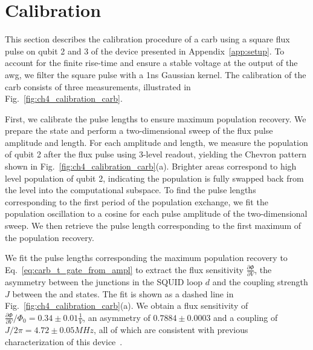 \section{Calibration} \label{sec:carb_calibration}
This section describes the calibration procedure of a \gls{carb} using a square flux pulse on qubit 2 and 3 of the device presented in Appendix~\ref{app:setup}. To account for the finite rise-time and ensure a stable voltage at the output of the \gls{awg}, we filter the square pulse with a 1\unit{ns} Gaussian kernel. The calibration of the \gls{carb} consists of three measurements, illustrated in Fig.~\ref{fig:ch4_calibration_carb}.

First, we calibrate the pulse lengths to ensure maximum population recovery. We prepare the \oo{} state and perform a two-dimensional sweep of the flux pulse amplitude and length. For each amplitude and length, we measure the \1{} population of qubit 2 after the flux pulse using 3-level readout, yielding the Chevron pattern shown in Fig.~\ref{fig:ch4_calibration_carb}(a). Brighter areas correspond to high
level population of qubit 2, indicating the population is fully swapped back from the \2{} level into the computational subspace. To find the pulse lengths corresponding to the first period of the population exchange, we fit the \1{} population oscillation to a cosine for each pulse amplitude of the two-dimensional sweep. We then retrieve the pulse length corresponding to the first maximum of the population recovery.

We fit the pulse lengths corresponding the maximum population recovery to Eq.~\eqref{eq:carb_t_gate_from_ampl} to extract the flux sensitivity $\frac { \partial \Phi} { \partial V }$, the asymmetry between the junctions in the SQUID loop $d$  and the coupling strength $J$ between the \oo{} and \tz{} states. The fit is shown as a dashed line in Fig.~\ref{fig:ch4_calibration_carb}(a). We obtain a flux sensitivity of $\frac { \partial \Phi} { \partial V } / \Phi_0 = 0.34 \pm 0.01 \unit{\frac{1}{V}}$, an asymmetry of $0.7884 \pm 0.0003$ and a coupling of $J/2\pi =  4.72 \pm 0.05 \unit{MHz}$, all of which are consistent with previous characterization of this device~\cite{Andersen2019, Andersen2019a}.

